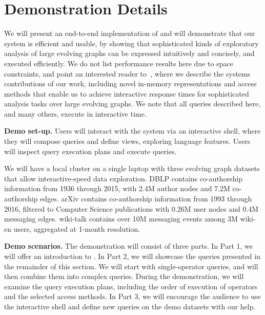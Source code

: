 \section{Demonstration Details}
\label{sec:cases}

We will present an end-to-end implementation of \sys and will
demonstrate that our system is efficient and usable, by showing that
sophisticated kinds of exploratory analysis of large evolving graphs
can be expressed intuitively and concisely, and executed efficiently.
We do not list performance results here due to space constraints, and
point an interested reader to~\cite{PortalarXiv2016}, where we
describe the systems contributions of our work, including novel
in-memory representations and access methods that enable us to achieve
interactive response times for sophisticated analysis tasks over large
evolving graphs.  We note that all queries described here, and many
others, execute in interactive time.

{\bf Demo set-up.} Users will interact with the \sys system via an
interactive shell, where they will compose queries and define \tg
views, exploring language features.  Users will inspect query
execution plans and execute queries.

We will have a local cluster on a single laptop with three evolving
graph datasets that allow interactive-speed data exploration. DBLP
contains co-authorship information from 1936 through 2015, with 2.4M
author nodes and 7.2M co-authorship edges.  arXiv contains
co-authorship information from 1993 through 2016, filtered to Computer
Science publications with 0.26M user nodes and 0.4M messaging edges.
wiki-talk contains over 10M messaging events among 3M wiki-en
users, aggregated at 1-month resolution.

{\bf Demo scenarios.} The demonstration will consist of three parts.
In Part 1, we will offer an introduction to \ql.  In Part 2, we will
showcase the queries presented in the remainder of this section. We will start with single-operator
queries, and will then combine them into complex queries.  During the
demonstration, we will examine the query execution plans, including
the order of execution of \tga operators and the selected access
methods.  In Part 3, we will encourage the audience to use the
interactive shell and define new queries on the demo datasets with our
help.

